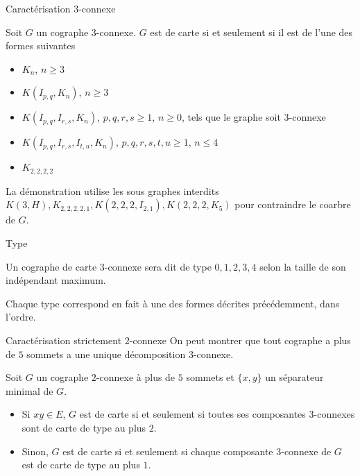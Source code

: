 \documentclass{beamer}
\begin{document}
\begin{frame}{Caractérisation $3$-connexe}
    \begin{thm}
        Soit $G$ un cographe $3$-connexe. $G$ est de carte si et seulement si il est de l'une des formes suivantes
        \begin{itemize}
            \item $K_n$, $n \geq 3$
            \item $K(I_{p,q}, K_n)$, $n \geq 3$
            \item $K(I_{p,q}, I_{r,s}, K_n)$, $p,q,r,s \geq 1$, $n \geq 0$, tels que le graphe soit $3$-connexe
            \item $K(I_{p,q}, I_{r,s}, I_{t,u}, K_n)$, $p,q,r,s,t,u \geq 1$, $n \leq 4$
            \item $K_{2,2,2,2}$
        \end{itemize}
    \end{thm}

    La démonstration utilise les sous graphes interdits $K(3,H), K_{2,2,2,2,1}, K(2,2,2,I_{2,1}), K(2,2,2,K_5)$
    pour contraindre le coarbre de $G$.
\end{frame}

\begin{frame}{Type}
    \begin{definition}
        Un cographe de carte $3$-connexe sera dit de type $0, 1, 2, 3, 4$ selon la taille de son indépendant
        maximum.
    \end{definition}
    Chaque type correspond en fait à une des formes décrites précédemment, dans l'ordre.
\end{frame}

\begin{frame}{Caractérisation strictement $2$-connexe}
    On peut montrer que tout cographe a plus de $5$ sommets a une unique décomposition $3$-connexe.

    \begin{thm}
        Soit $G$ un cographe $2$-connexe à plus de $5$ sommets et $\{x,y\}$ un séparateur minimal de $G$. 
        \begin{itemize}
            \item Si $xy \in E$, $G$ est de carte si et seulement si toutes ses composantes $3$-connexes sont de carte de type au plus $2$.
            \item Sinon, $G$ est de carte si et seulement si chaque composante $3$-connexe de $G$ est de carte de type au plus $1$.
        \end{itemize}
    \end{thm}
\end{frame}
\end{document}

